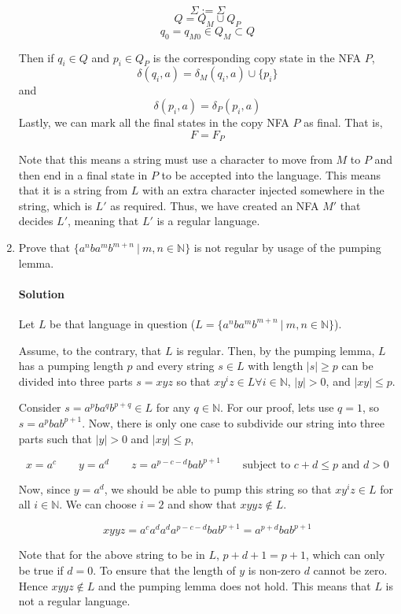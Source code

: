 \documentclass[11pt]{article}
\newcommand{\solution}[1]{\paragraph{Solution}  }
\begin{document}
\begin{enumerate}
    $$\Sigma := \Sigma$$
    $$Q = Q_M \cup Q_P$$
    $$q_0 = q_{M0} \in Q_M \subset Q $$

    Then if $q_i \in Q$ and $p_i \in Q_P$ is the corresponding copy state in the NFA $P$,
    $$\delta(q_i, a) = \delta_M(q_i, a) \cup \{p_i\} $$
    and
    $$\delta(p_i, a) = \delta_P(p_i, a)$$
    Lastly, we can mark all the final states in the copy NFA $P$ as final. That is,
    $$F = F_P$$

    Note that this means a string must use a character to move from $M$ to $P$ and then end in a final state in $P$ to be accepted into the language. This means that it is a string from $L$ with an extra character injected somewhere in the string, which is $L'$ as required. Thus, we have created an NFA $M'$ that decides $L'$, meaning that $L'$ is a regular language.

    \item Prove that $\{a^nba^mb^{m+n} ~|~ m,n \in \mathbb{N}\}$ is not regular by usage of the pumping lemma.

    \solution{} Let $L$ be that language in question ($L = \{a^nba^mb^{m+n} ~|~ m,n \in \mathbb{N}\}$). 

    Assume, to the contrary, that $L$ is regular. Then, by the pumping lemma, $L$ has a pumping length $p$ and every string $s \in L$ with length $|s| \geq p$ can be divided into three parts $s=xyz$ so that $xy^iz \in L \forall i \in \mathbb{N}$, $|y|>0$, and $|xy| \leq p$.

    Consider $s=a^pba^qb^{p+q} \in L$ for any $q \in \mathbb{N}$. For our proof, lets use $q = 1$, so $s = a^pbab^{p + 1}$. Now, there is only one case to subdivide our string into three parts such that $|y| > 0$ and $|xy| \leq p$,

    $$x=a^c \qquad y=a^d \qquad z=a^{p - c - d}bab^{p+1} \qquad \text{subject to } c + d \leq p \text{ and } d > 0$$

    Now, since $y=a^d$, we should be able to pump this string so that $xy^iz \in L$ for all $i \in \mathbb{N}$. We can choose $i = 2$ and show that $xyyz \notin L$.

    $$xyyz = a^ca^da^da^{p - c - d}bab^{p+1} = a^{p + d}bab^{p + 1}$$

    Note that for the above string to be in $L$, $p + d + 1 = p + 1$, which can only be true if $d = 0$. To ensure that the length of $y$ is non-zero $d$ cannot be zero. Hence $xyyz \notin L$ and the pumping lemma does not hold. This means that $L$ is not a regular language. 

    \newpage
    

\end{enumerate}
\end{document}
